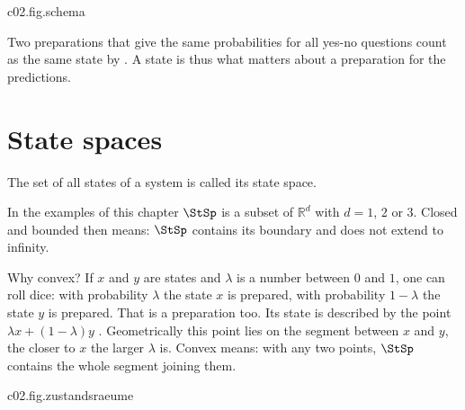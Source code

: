 \begin{tpcfigure}{c02.fig.schema}
  \caption{One run of an experiment. The preparation puts the system into a state $x$;
    then a yes-no question is asked. The theory predicts the probability $f(x)$ of the
    answer yes. Throughout the chapter states are drawn solid and as filled dots, effects
    dashed and as squares.}
\end{tpcfigure}

Two preparations that give the same probabilities for all yes-no questions count as the
same state by . A state is thus what matters about a preparation for the
predictions.

\section{State spaces}\label{c02.s2}

The set of all states of a system is called its state space.


In the examples of this chapter $\StSp$ is a subset of $\mathbb{R}^d$ with $d = 1$, $2$ or
$3$. Closed and bounded then means: $\StSp$ contains its boundary and does not extend to
infinity.

Why convex? If $x$ and $y$ are states and $\lambda$ is a number between $0$ and $1$, one
can roll dice: with probability $\lambda$ the state $x$ is prepared, with probability
$1-\lambda$ the state $y$ is prepared. That is a preparation too. Its state is described
by the point $\lambda x + (1-\lambda) y$
.
Geometrically this point lies on the segment between $x$ and $y$, the closer to $x$ the
larger $\lambda$ is. Convex means: with any two points, $\StSp$ contains the whole segment
joining them.


\begin{tpcfigure}{c02.fig.zustandsraeume}
  \caption{The three state spaces of this chapter: (a) a segment, (b) a square, (c) a
    ball, drawn here with its equator. In each the mixture $z = \tfrac14 x + \tfrac34 y$
    of two states $x$ and $y$ is marked (open circle); it lies on the segment joining
    them, three times as close to $y$ as to $x$. The pure states are the two end points
    $s_0$, $s_1$ in (a), the four corners $s_{00}$, $s_{10}$, $s_{01}$, $s_{11}$ in (b),
    and all points of the surface of the ball in (c). This is verified in
    Section~\ref{c02.s4}.}
\end{tpcfigure}

